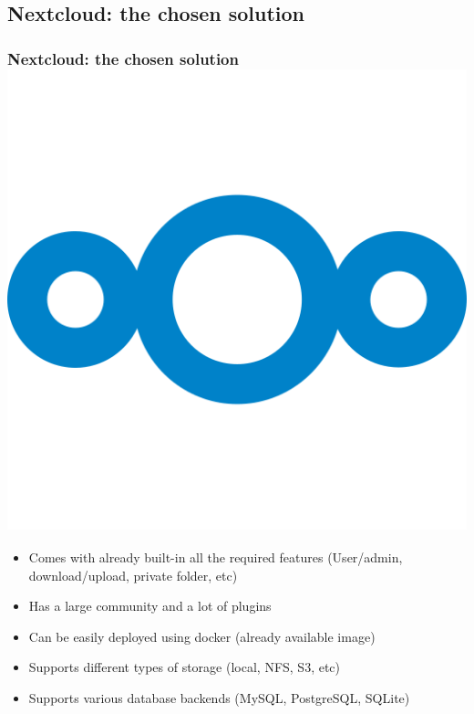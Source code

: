 \documentclass{beamer}
\begin{document}
\begin{frame}
\begin{center}
\begin{tabular}{cc}
        \end{tabular}
    \end{center}
\end{frame}


\subsection{Nextcloud: the chosen solution}
\begin{frame}
    \frametitle{Nextcloud: the chosen solution \qquad \includegraphics[height=0.09\textheight]{images/other/nextcloud-logo}}    
    \begin{itemize}
        \item Comes with already built-in all the required features (User/admin, download/upload, private folder, etc)
        \item Has a large community and a lot of plugins
        \item Can be easily deployed using docker (already available image)
        \item Supports different types of storage (local, NFS, S3, etc)
        \item Supports various database backends (MySQL, PostgreSQL, SQLite)
    \end{itemize}
\end{frame}
\end{document}
